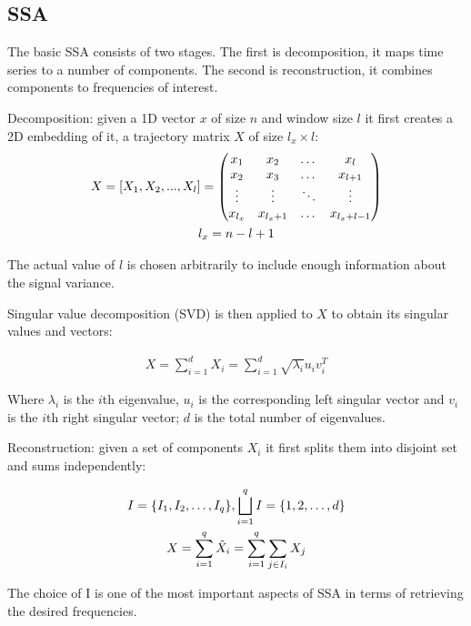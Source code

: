 \documentclass{article}
\begin{document}
\subsection{SSA}

The basic SSA consists of two stages. The first is decomposition, it maps time series to a number of components. The second is reconstruction, it combines components to frequencies of interest.

Decomposition: given a 1D vector \(x\) of size \(n\) and window size \(l\) it first creates a 2D embedding of it, a trajectory matrix \(X\) of size \(l_x \times l\):
\begin{gather}
X = [X_1, X_2, ..., X_{l}] =
 \begin{pmatrix}
	x_{1} & x_{2} & \dots & x_{l} \\
	x_{2} & x_{3} & \dots & x_{l + 1} \\
	\vdots & \vdots & \ddots & \vdots \\
	x_{l_{x}} & x_{l_x + 1} &  \dots & x_{l_x + l - 1}
\end{pmatrix} \notag \\
l_x = n - l + 1
\end{gather}

The actual value of \(l\) is chosen arbitrarily to include enough information about the signal variance.

Singular value decomposition (SVD) is then applied to \(X\) to obtain its singular values and vectors:

\begin{gather}
X = \sum \limits_{i = 1}^{d} X_i = \sum \limits_{i = 1}^{d} \sqrt{\lambda_i} u_i v_i^T
\end{gather}

Where \( \lambda_i \) is the \(i\)th eigenvalue, \(u_i\) is the corresponding left singular vector and \(v_i\) is the \(i\)th right singular vector; \(d\) is the total number of eigenvalues.

Reconstruction: given a set of components \(X_i\) it first splits them into disjoint set and sums independently:

\begin{gather}
I = \{ I_1, I_2, \dots, I_q \}, \bigsqcup \limits_{i = 1}^{q} I = \{1, 2, \dots, d\} \notag \\
X = \sum \limits_{i = 1}^{q} \hat{X}_i = \sum \limits_{i = 1}^{q} \sum \limits_{j \in I_i} X_j
\end{gather}

The choice of I is one of the most important aspects of SSA in terms of retrieving the desired frequencies.
\end{document}
